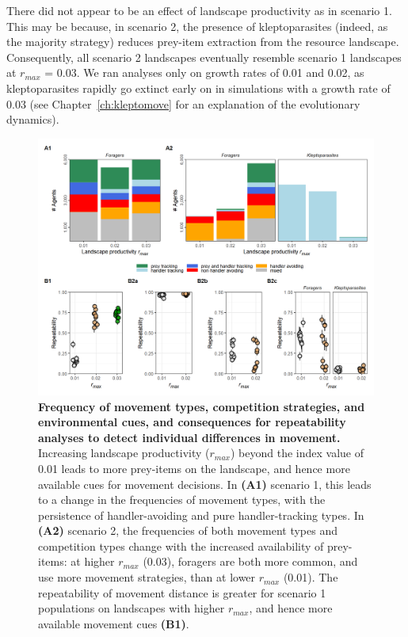     There did not appear to be an effect of landscape productivity as in scenario 1.
    This may be because, in scenario 2, the presence of kleptoparasites (indeed, as the majority strategy) reduces prey-item extraction from the resource landscape.
    Consequently, all scenario 2 landscapes eventually resemble scenario 1 landscapes at $r_{max}$ = 0.03.
    We ran analyses only on growth rates of 0.01 and 0.02, as kleptoparasites rapidly go extinct early on in simulations with a growth rate of 0.03 (see Chapter~\ref{ch:kleptomove} for an explanation of the evolutionary dynamics).
    
    \begin{figure}[h!]
        \centering
        \includegraphics[width=1.0\textwidth]{figures/patternprocess/fig_03.png}
        \caption{
            \textbf{Frequency of movement types, competition strategies, and environmental cues, and consequences for repeatability analyses to detect individual differences in movement.}
            Increasing landscape productivity ($r_{max}$) beyond the index value of 0.01 leads to more prey-items on the landscape, and hence more available cues for movement decisions.
            In \textbf{(A1)} scenario 1, this leads to a change in the frequencies of movement types, with the persistence of handler-avoiding and pure handler-tracking types.
            In \textbf{(A2)} scenario 2, the frequencies of both movement types and competition types change with the increased availability of prey-items: at higher $r_{max}$ (0.03), foragers are both more common, and use more movement strategies, than at lower $r_{max}$ (0.01).
            The repeatability of movement distance is greater for scenario 1 populations on landscapes with higher $r_{max}$, and hence more available movement cues \textbf{(B1)}.
}
\end{figure}
